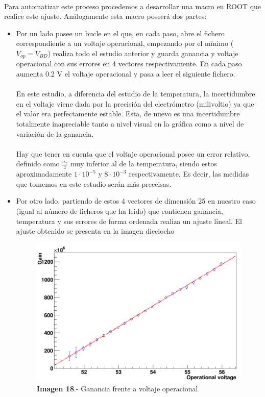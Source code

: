 \documentclass[11pt, a4paper]{article}
\begin{document}
\paragraph {}
Para automatizar este proceso procedemos a desarrollar una macro en ROOT que realice este ajuste. Análogamente esta macro poseerá dos partes:
\begin{itemize}
\item{} Por un lado posee un bucle en el que, en cada paso, abre el fichero correspondiente a un voltaje operacional, empezando por el mínimo ($V_{op}=V_{BD}$) realiza todo el estudio anterior y guarda ganancia y voltaje operacional con sus errores en 4 vectores respectivamente. En cada paso aumenta 0.2 V el voltaje operacional y pasa a leer el siguiente fichero. 

\paragraph {}
En este estudio, a diferencia del estudio de la temperatura, la incertidumbre en el voltaje viene dada por la precisión del electrómetro (milivoltio) ya que el valor era perfectamente estable. Esta, de nuevo es una incertidumbre totalmente inapreciable tanto a nivel visual en la gráfica como a nivel de variación de la ganancia. 
\paragraph {}
Hay que tener en cuenta que el voltaje operacional posee un error relativo, definido como $\frac{\sigma_x}{x}$ muy inferior al de la temperatura, siendo estos aproximadamente $1 \cdot 10^{-5}$ y $8 \cdot 10^{-3}$ respectivamente. Es decir, las medidas que tomemos en este estudio serán más preceisas.

\item {} Por otro lado, partiendo de estos 4 vectores de dimensión 25 en nuestro caso (igual al número de ficheros que ha leido) que contienen ganancia, temperatura y sus errores de forma ordenada realiza un ajuste lineal. El ajuste obtenido se presenta en la imagen dieciocho

\begin{figure}[hbtp]
\centering
\includegraphics[scale=0.2]{Dependenciavoltaje.png}
\caption{\textbf{Imagen 18}.- Ganancia frente a voltaje operacional}
\end{figure}


\end{itemize}
\end{document}
